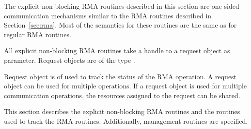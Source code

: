 The explicit non-blocking \ac{RMA} routines described in this section are
one-sided communication mechanisms similar to the \ac{RMA} routines
described in Section~\ref{sec:rma}. Most of the semantics for these
routines are the same as for regular \ac{RMA} routines.

All explicit non-blocking \ac{RMA} routines take a handle to a request
object as parameter. Request objects are of the type .

Request object is of used to track the status of the \ac{RMA}
operation. A request object can be used for multiple operations. If a
request object is used for multiple communication operations, the
resources assigned to the request can be shared.

This section describes the explicit non-blocking \ac{RMA}
routines and the routines used to track the \ac{RMA} routines.
Additionally, management routines are specified.
